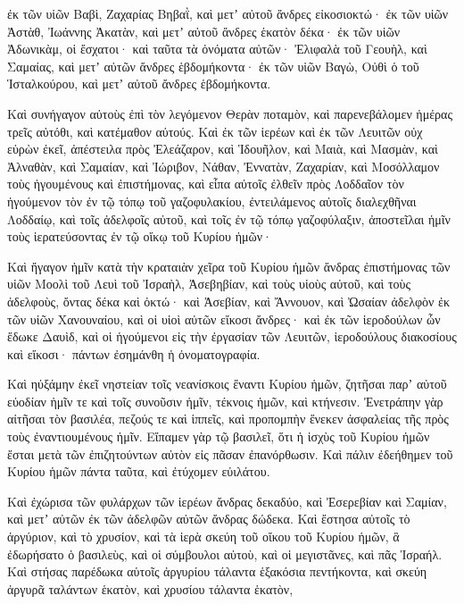 {ἐκ τῶν υἱῶν Βαβὶ, Ζαχαρίας Βηβαῒ, καὶ μετʼ αὐτοῦ ἄνδρες εἰκοσιοκτώ·
ἐκ τῶν υἱῶν Ἀστὰθ, Ἰωάννης Ἀκατὰν, καὶ μετʼ αὐτοῦ ἄνδρες ἑκατὸν δέκα·
ἐκ τῶν υἱῶν Ἀδωνικὰμ, οἱ ἔσχατοι· καὶ ταῦτα τὰ ὀνόματα αὐτῶν· Ἐλιφαλὰ τοῦ Γεουὴλ, καὶ Σαμαίας, καὶ μετʼ αὐτῶν ἄνδρες ἑβδομήκοντα·
ἐκ τῶν υἱῶν Βαγὼ, Οὐθὶ ὁ τοῦ Ἱσταλκούρου, καὶ μετʼ αὐτοῦ ἄνδρες ἑβδομήκοντα.
\par }{\PP {}Καὶ συνήγαγον αὐτοὺς ἐπὶ τὸν λεγόμενον Θερὰν ποταμὸν, καὶ παρενεβάλομεν ἡμέρας τρεῖς αὐτόθι, καὶ κατέμαθον αὐτούς.
Καὶ ἐκ τῶν ἱερέων καὶ ἐκ τῶν Λευιτῶν οὐχ εὑρὼν ἐκεῖ,
ἀπέστειλα πρὸς Ἐλεάζαρον, καὶ Ἱδουῆλον, καὶ Μαιὰ, καὶ Μασμὰν, καὶ Ἀλναθὰν, καὶ Σαμαίαν, καὶ Ἰώριβον, Νάθαν,
Ἐννατὰν, Ζαχαρίαν, καὶ Μοσόλλαμον τοὺς ἡγουμένους καὶ ἐπιστήμονας,
καὶ εἶπα αὐτοῖς ἐλθεῖν πρὸς Λοδδαῖον τὸν ἡγούμενον τὸν ἐν τῷ τόπῳ τοῦ γαζοφυλακίου,
ἐντειλάμενος αὐτοῖς διαλεχθῆναι Λοδδαίῳ, καὶ τοῖς ἀδελφοῖς αὐτοῦ, καὶ τοῖς ἐν τῷ τόπῳ γαζοφύλαξιν, ἀποστεῖλαι ἡμῖν τοὺς ἱερατεύσοντας ἐν τῷ οἴκῳ τοῦ Κυρίου ἡμῶν·
\par }{\PP {}Καὶ ἤγαγον ἡμῖν κατὰ τὴν κραταιὰν χεῖρα τοῦ Κυρίου ἡμῶν ἄνδρας ἐπιστήμονας τῶν υἱῶν Μοολὶ τοῦ Λευὶ τοῦ Ἰσραὴλ, Ἀσεβηβίαν, καὶ τοὺς υἱοὺς αὐτοῦ, καὶ τοὺς ἀδελφοὺς, ὄντας δέκα καὶ ὀκτώ·
καὶ Ἀσεβίαν, καὶ Ἄννουον, καὶ Ὠσαίαν ἀδελφὸν ἐκ τῶν υἱῶν Χανουναίου, καὶ οἱ υἱοὶ αὐτῶν εἴκοσι ἄνδρες·
καὶ ἐκ τῶν ἱεροδούλων ὧν ἔδωκε Δαυὶδ, καὶ οἱ ἡγούμενοι εἰς τὴν ἐργασίαν τῶν Λευιτῶν, ἱεροδούλους διακοσίους καὶ εἴκοσι· πάντων ἐσημάνθη ἡ ὀνοματογραφία.
\par }{\PP {}Καὶ ηὐξάμην ἐκεῖ νηστείαν τοῖς νεανίσκοις ἔναντι Κυρίου ἡμῶν, ζητῆσαι παρʼ αὐτοῦ εὐοδίαν ἡμῖν τε καὶ τοῖς συνοῦσιν ἡμῖν, τέκνοις ἡμῶν, καὶ κτήνεσιν.
Ἐνετράπην γὰρ αἰτῆσαι τὸν βασιλέα, πεζούς τε καὶ ἱππεῖς, καὶ προπομπὴν ἕνεκεν ἀσφαλείας τῆς πρὸς τοὺς ἐναντιουμένους ἡμῖν.
Εἴπαμεν γὰρ τῷ βασιλεῖ, ὅτι ἡ ἰσχὺς τοῦ Κυρίου ἡμῶν ἔσται μετὰ τῶν ἐπιζητούντων αὐτὸν εἰς πᾶσαν ἐπανόρθωσιν.
Καὶ πάλιν ἐδεήθημεν τοῦ Κυρίου ἡμῶν πάντα ταῦτα, καὶ ἐτύχομεν εὐιλάτου.
\par }{\PP {}Καὶ ἐχώρισα τῶν φυλάρχων τῶν ἱερέων ἄνδρας δεκαδύο, καὶ Ἐσερεβίαν καὶ Σαμίαν, καὶ μετʼ αὐτῶν ἐκ τῶν ἀδελφῶν αὐτῶν ἄνδρας δώδεκα.
Καὶ ἔστησα αὐτοῖς τὸ ἀργύριον, καὶ τὸ χρυσίον, καὶ τὰ ἱερὰ σκεύη τοῦ οἴκου τοῦ Κυρίου ἡμῶν, ἃ ἐδωρήσατο ὁ βασιλεὺς, καὶ οἱ σύμβουλοι αὐτοὺ, καὶ οἱ μεγιστᾶνες, καὶ πᾶς Ἰσραήλ.
Καὶ στήσας παρέδωκα αὑτοῖς ἀργυρίου τάλαντα ἑξακόσια πεντήκοντα, καὶ σκεύη ἀργυρᾶ ταλάντων ἑκατὸν, καὶ χρυσίου τάλαντα ἑκατὸν,
}
